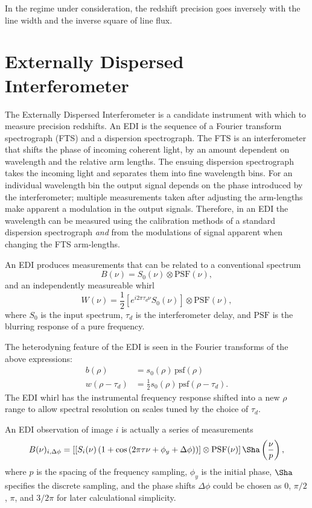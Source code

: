 \documentclass[preprint]{aastex}
\begin{document}
In the regime under consideration, the redshift precision goes inversely with the line width and the inverse square of line flux.

\section{Externally Dispersed Interferometer}
The Externally Dispersed Interferometer \citep[EDI;][]{2003PASP..115..255E} is a candidate instrument with which to measure precision redshifts.
An EDI is the sequence of a Fourier transform spectrograph (FTS) and a dispersion spectrograph.  The FTS is an interferometer that shifts
the phase of incoming coherent light, 
by an amount dependent on wavelength and the relative arm lengths.
The ensuing dispersion spectrograph takes the incoming light and separates them into fine wavelength bins.
For an individual wavelength bin the output signal depends on the phase introduced by the interferometer; multiple
measurements taken after adjusting the arm-lengths make apparent a modulation in the output signals.
Therefore, in an EDI the wavelength can be measured using the calibration methods of a standard dispersion
spectrograph {\it and} from the modulations of signal apparent when changing the FTS arm-lengths.

An EDI produces measurements that can be related
to a conventional spectrum
\begin{equation}
B(\nu) = S_0(\nu) \otimes \mbox{PSF}(\nu),
\end{equation}
and an independently measureable whirl
\begin{equation}
W(\nu) = \frac{1}{2}\left[e^{i2\pi\tau_d\nu}S_0(\nu)\right] \otimes \mbox{PSF}(\nu),
\end{equation}
where $S_0$ is the input spectrum, $\tau_d$ is the interferometer delay, and $\mbox{PSF}$  is the blurring
response of a pure frequency.

The heterodyning feature of the EDI is seen in the Fourier transforms of the above expressions:
\begin{align}
b(\rho) & =s_0(\rho) \, \mbox{psf}(\rho)\\
w(\rho -\tau_d) & =\frac{1}{2} s_0(\rho) \, \mbox{psf}(\rho-\tau_d).
\end{align}
The EDI whirl has the instrumental frequency response shifted into a new $\rho$ range to allow
spectral
resolution on scales tuned by the choice of $\tau_d$.

An EDI observation of image $i$ is actually a series of measurements
\begin{equation}
B(\nu)_{i,\Delta\phi} = \left[\left[S_i(\nu)\left(1+\cos{\left(2\pi\tau\nu+\phi_y+\Delta\phi \right)} \right)\right]\otimes \mbox{PSF}(\nu)\right]\Sha\left(\frac{\nu}{p}\right),
\end{equation}
where $p$ is the spacing of the frequency sampling, $\phi_y$ is the initial phase, $\Sha$ specifies the discrete sampling,
and the phase shifts $\Delta\phi$ could be chosen as
$0$, $\pi/2$, $\pi$, and $3/2\pi$ for later calculational simplicity.
\end{document}
